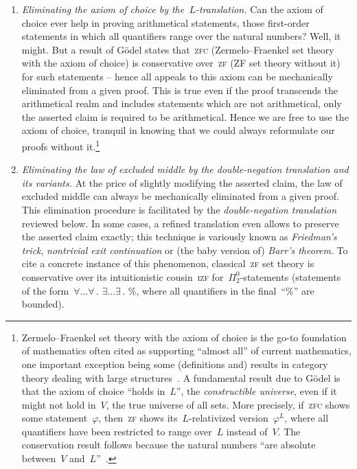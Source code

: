 \documentclass[10pt,reqno,a4paper,openany]{amsbook}
\theoremstyle{definition}
\theoremstyle{plain}
\theoremstyle{remark}
\newcommand{\?}{\,{:}\,}
\renewcommand{\_}{\mathpunct{.}\,}
\begin{document}
\begin{enumerate}
\item \emph{Eliminating the axiom of choice by the~$L$-translation.} Can the
axiom of choice ever help in proving arithmetical statements, those first-order
statements in which all quantifiers range over the natural numbers? Well, it
might. But a result of Gödel states that~\textsc{zfc} (Zermelo--Fraenkel set
theory with the axiom of choice) is conservative over~\textsc{zf} (ZF set
theory without it) for such statements -- hence all appeals to this axiom can
be mechanically eliminated from a given proof. This is true even if the proof
transcends the arithmetical realm and includes statements which are not
arithmetical, only the asserted claim is required to be arithmetical. Hence we
are free to use the axiom of choice, tranquil in knowing that we could always
reformulate our proofs without it.\footnote{Zermelo--Fraenkel set theory with
the axiom of choice is the go-to foundation of mathematics often cited as
supporting ``almost all'' of current mathematics, one important exception being
some (definitions and) results in category theory dealing with large
structures~\cite{shulman:set-theory,feferman:set-foundations}. A fundamental
result due to Gödel is that the axiom of choice ``holds in~$L$'', the
\emph{constructible universe}, even if it might not hold in~$V$, the true
universe of all sets. More precisely, if~\textsc{zfc} shows some
statement~$\varphi$, then~\textsc{zf} shows its~$L$-relativized
version~$\varphi^L$, where all quantifiers have been restricted to range
over~$L$ instead of~$V$. The conservation result follows because the natural
numbers ``are absolute between~$V$
and~$L$''~\cite{goedel:ac-gch,schoenfield:predicativity}.}

\item \emph{Eliminating the law of excluded middle by the double-negation
translation and its variants.} At the price of
slightly modifying the asserted claim, the law of excluded middle
can always be mechanically eliminated from a given proof. This
elimination procedure is facilitated by the \emph{double-negation translation}
reviewed below. In some cases, a refined translation even allows to preserve the asserted
claim exactly; this technique is variously known as \emph{Friedman's trick},
\emph{nontrivial exit continuation} or (the baby version of) \emph{Barr's
theorem}. To cite a concrete instance of this phenomenon, classical~\textsc{zf}
set theory is conservative over its intuitionistic cousin~\textsc{izf}
for~$\Pi^0_2$-statements (statements of the form~$\forall\ldots\forall\_
\exists\ldots\exists\_ \%$, where all quantifiers in the final~``$\%$''
are bounded).


\end{enumerate}
\end{document}
